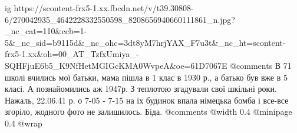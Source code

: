  
 
 
 
 

\ifcmt
  ig https://scontent-frx5-1.xx.fbcdn.net/v/t39.30808-6/270042935_4642228332550598_8208656940660111861_n.jpg?_nc_cat=110&ccb=1-5&_nc_sid=b9115d&_nc_ohc=3dt8yM7hrjYAX_F7u3t&_nc_ht=scontent-frx5-1.xx&oh=00_AT_TzfxUmiya_-SQHFjuE6b5_K9NfHetMGIGcKMA0WvpeA&oe=61D7067E
	@comments%
    В 71 школі вчились мої батьки, мама пішла в 1 клас в 1930 р., а батько був вже
    в 5 класі. А познайомились аж 1947р. З теплотою згадували свої шкільні роки.
    Нажаль, 22.06.41 р. о 7-05 - 7-15 на їх будинок впала німецька бомба і все-все
    згоріло, жодного фото не залишилось. Біда.
	@comments%
  @width 0.4
  @minipage 0.4
  @wrap \parpic[r]
\fi
